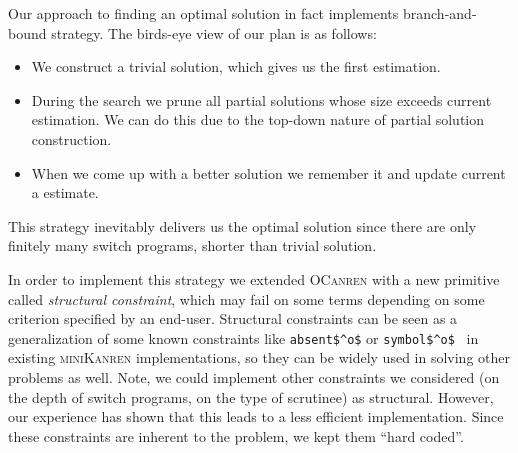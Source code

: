 Our approach to finding an optimal solution in fact implements branch-and-bound strategy. The birds-eye view of our plan is as follows:

\FloatBarrier

\begin{itemize}
\item We construct a trivial solution, which gives us the first estimation.
\item During the search we prune all partial solutions whose size exceeds current estimation. We can do this due to
  the top-down nature of partial solution construction.
\item When we come up with a better solution we remember it and update current a estimate.
\end{itemize}

\noindent This strategy inevitably delivers us the optimal solution since there are only finitely many switch programs, shorter than trivial solution.

In order to implement this strategy we extended \textsc{OCanren} with a new primitive called \emph{structural constraint}, which may
fail on some terms depending on some criterion specified by an end-user. Structural constraints can be seen as a generalization of
some known constraints like \lstinline|absent$^o$| or \lstinline|symbol$^o$|~\cite{Untagged} in existing \textsc{miniKanren} implementations, 
so they can be widely used in solving other problems as well. Note, we could implement other constraints we considered (on the
depth of switch programs, on the type of scrutinee) as structural. However, our experience has shown that this leads to
a less efficient implementation. Since these constraints are inherent to the problem, we kept them ``hard coded''.
